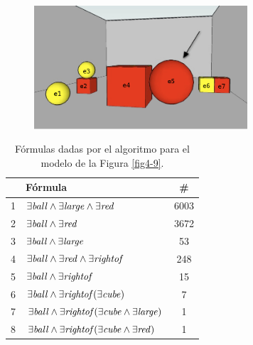 \begin{figure}[h]
\centering
\includegraphics[width=300]{images/22.jpg}
\label{GRE3D7-stimulus-22-apendice}
\end{figure}


\label{formulas-gre3d7}
\begin{table}[h]
\begin{center}
\begin{tabular}{|l|l|c|}
\hline
&F\'ormula			      &  \# \\ \hline \hline

1&$\exists \mathit{ball} \land \exists \mathit{large} \land \exists \mathit{red}$		&6003 \\ \hline
2&$\exists \mathit{ball} \land \exists \mathit{red}$		&3672 \\ \hline
3&$\exists \mathit{ball} \land \exists \mathit{large}$		&53 \\ \hline
4&$\exists \mathit{ball} \land \exists \mathit{red} \land \exists \mathit{rightof}$	&	248 \\ \hline
5&$\exists \mathit{ball} \land \exists \mathit{rightof}$		&15 \\ \hline
6&$\exists \mathit{ball} \land \exists \mathit{rightof}(\exists \mathit{cube})$	&	7 \\ \hline
7&$\exists \mathit{ball} \land \exists \mathit{rightof}(\exists \mathit{cube} \land \exists \mathit{large})$&		1 \\ \hline
8&$\exists \mathit{ball} \land \exists \mathit{rightof}(\exists \mathit{cube} \land \exists \mathit{red})$		&1 \\ \hline

\end{tabular}

\caption{F\'ormulas dadas por el algoritmo para el modelo de la Figura \protect\ref{fig4-9}.}\label{formulas-mapa-gre3d7-apendice}
\end{center}
\end{table}


